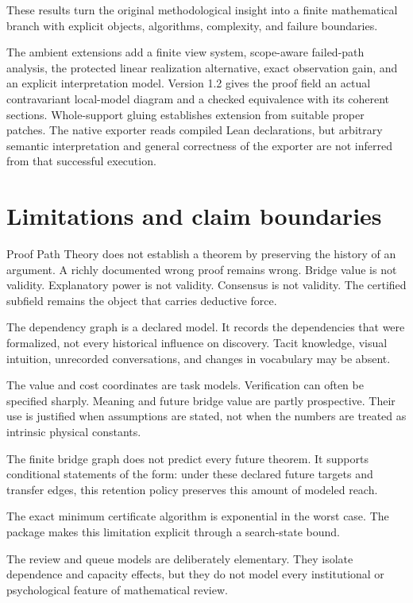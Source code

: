 \documentclass[11pt,oneside]{article}
\theoremstyle{definition}
\theoremstyle{remark}
\begin{document}
These results turn the original methodological insight into a finite mathematical branch with explicit objects, algorithms, complexity, and failure boundaries.

\noindent The ambient extensions add a finite view system, scope-aware failed-path analysis, the protected linear realization alternative, exact observation gain, and an explicit interpretation model. Version 1.2 gives the proof field an actual contravariant local-model diagram and a checked equivalence with its coherent sections. Whole-support gluing establishes extension from suitable proper patches. The native exporter reads compiled Lean declarations, but arbitrary semantic interpretation and general correctness of the exporter are not inferred from that successful execution.

\section{Limitations and claim boundaries}

Proof Path Theory does not establish a theorem by preserving the history of an argument. A richly documented wrong proof remains wrong. Bridge value is not validity. Explanatory power is not validity. Consensus is not validity. The certified subfield remains the object that carries deductive force.

The dependency graph is a declared model. It records the dependencies that were formalized, not every historical influence on discovery. Tacit knowledge, visual intuition, unrecorded conversations, and changes in vocabulary may be absent.

The value and cost coordinates are task models. Verification can often be specified sharply. Meaning and future bridge value are partly prospective. Their use is justified when assumptions are stated, not when the numbers are treated as intrinsic physical constants.

The finite bridge graph does not predict every future theorem. It supports conditional statements of the form: under these declared future targets and transfer edges, this retention policy preserves this amount of modeled reach.

The exact minimum certificate algorithm is exponential in the worst case. The package makes this limitation explicit through a search-state bound.

The review and queue models are deliberately elementary. They isolate dependence and capacity effects, but they do not model every institutional or psychological feature of mathematical review.
\end{document}
